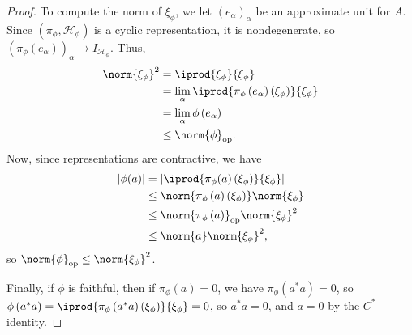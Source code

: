 \documentclass[10pt]{mypackage}
\DeclareMathOperator{\op}{op}
\begin{document}
\begin{proof}
  To compute the norm of $\xi_{\phi}$, we let $\left(e_{\alpha}\right)_{\alpha}$ be an approximate unit for $A$. Since $\left(\pi_{\phi},\mathcal{H}_{\phi}\right)$ is a cyclic representation, it is nondegenerate, so $\left(\pi_{\phi}\left(e_{\alpha}\right)\right)_{\alpha}\rightarrow I_{\mathcal{H}_{\phi}}$. Thus,
  \begin{align*}
    \norm{\xi_{\phi}}^2 &= \iprod{\xi_{\phi}}{\xi_{\phi}}\\
                        &= \lim_{\alpha} \iprod{\pi_{\phi}\left(e_{\alpha}\right)\left(\xi_{\phi}\right)}{\xi_{\phi}}\\
                        &= \lim_{\alpha}\phi\left(e_{\alpha}\right)\\
                        &\leq \norm{\phi}_{\op}.
  \end{align*}
  Now, since representations are contractive, we have
  \begin{align*}
    \left\vert \phi(a) \right\vert &= \left\vert \iprod{\pi_{\phi}(a)\left(\xi_{\phi}\right)}{\xi_{\phi}} \right\vert\\
                                   &\leq \norm{\pi_{\phi}\left(a\right)\left(\xi_{\phi}\right)} \norm{\xi_{\phi}}\\
                                   &\leq \norm{\pi_{\phi}\left(a\right)}_{\op}\norm{\xi_{\phi}}^2\\
                                   &\leq \norm{a}\norm{\xi_{\phi}}^2,
  \end{align*}
  so $\norm{\phi}_{\op}\leq \norm{\xi_{\phi}}^2$.\newline

  Finally, if $\phi$ is faithful, then if $\pi_{\phi}(a) = 0$, we have $\pi_{\phi}\left(a^{\ast}a\right) = 0$, so $\phi\left(a^{\ast}a\right)  = \iprod{\pi_{\phi}\left(a^{\ast}a\right)\left(\xi_{\phi}\right)}{\xi_{\phi}} = 0$, so $a^{\ast}a = 0$, and $a = 0$ by the $C^{\ast}$ identity.
\end{proof}
\end{document}
